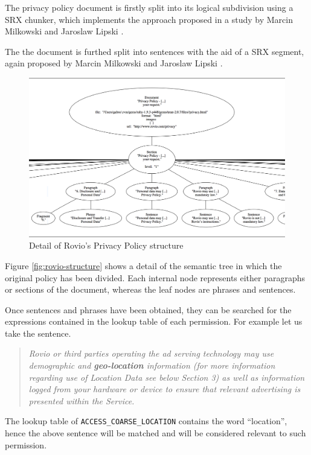 \documentclass[twoside,letterpaper]{soups}
\theoremstyle{definition}
\begin{document}
The privacy policy document is firstly split into its logical subdivision using a SRX chunker, which implements the approach proposed in a study by Marcin Milkowski and Jaroslaw Lipski \cite{Milkowski:2009:USS:1987717.1987736}.

The the document is furthed split into sentences with the aid of a SRX segment, again proposed by Marcin Milkowski and Jaroslaw Lipski \cite{Milkowski:2009:USS:1987717.1987736}.


\begin{figure}[t]
\centering
     \includegraphics[width=\textwidth]{images/rovio-structure}
      \caption{Detail of Rovio's Privacy Policy structure}
      \label{fig:rovio-structure}
\end{figure}

Figure \autoref{fig:rovio-structure} shows a detail of the semantic tree in which the original policy has been divided. Each internal node represents either paragraphs or sections of the document, whereas the leaf nodes are phrases and sentences.

Once sentences and phrases have been obtained, they can be searched for the expressions contained in the lookup table of each permission.
For example let us take the sentence.

\begin{quote}
{\emph{Rovio or third parties operating the ad serving technology may use demographic and \textbf{geo-location} information (for more information regarding use of Location Data see below Section 3) as well as information logged from your hardware or device to ensure that relevant advertising is presented within the Service.}}
\end{quote}

The lookup table of \texttt{ACCESS\_COARSE\_LOCATION} contains the word ``location'', hence the above sentence will be matched and will be considered relevant to such permission.
\end{document}
